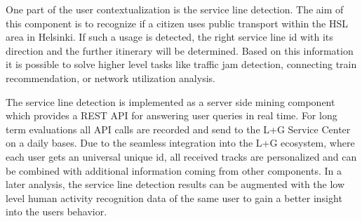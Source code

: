 \label{sec:SLD}

One part of the user contextualization is the service line detection. The aim of this component is to recognize if a citizen uses public transport within the HSL area in Helsinki. If such a usage is detected, the right service line id with its direction and the further itinerary will be determined. Based on this information it is possible to solve higher level tasks like traffic jam detection, connecting train recommendation, or network utilization analysis.

The service line detection is implemented as a server side mining component which provides a REST API for answering user queries in real time. For long term evaluations all API calls are recorded and send to the L+G Service Center on a daily bases. Due to the seamless integration into the L+G ecosystem, where each user gets an universal unique id, all received tracks are personalized and can be combined with additional information coming from other components. In a later analysis, the service line detection results can be augmented with the low level human activity recognition data of the same user to gain a better insight into the users behavior.

